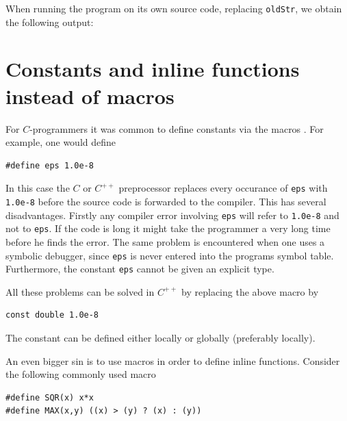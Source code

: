 When running the program on its own source code, replacing \verb+oldStr+, we
obtain the following output:



\section{Constants and inline functions instead of macros}

For $C$-programmers it was common to define constants  via the
macros  . For example, one would define
{\small \begin{verbatim}
#define eps 1.0e-8
\end{verbatim}}

\noindent
In this case the $C$ or $C^{++}$ preprocessor  replaces every
occurance of \verb+eps+ with \verb+1.0e-8+ before the source code is forwarded to
the compiler. This has several disadvantages. Firstly any compiler error involving
\verb+eps+ will refer to \verb+1.0e-8+ and not to \verb+eps+.
If the code is long it might take the programmer a very long time
before he finds the error. The same problem is encountered when one uses a symbolic
debugger, since \verb+eps+ is never entered into the programs symbol table.
Furthermore, the constant \verb+eps+ cannot be given an explicit type.

All these problems can be solved in $C^{++}$ by replacing the above macro by
{\small \begin{verbatim}
const double 1.0e-8
\end{verbatim}}
\noindent
The constant can be defined either locally or globally (preferably locally).

An even bigger sin is to use macros  in order to define inline functions.
  Consider the following commonly used macro
{\small \begin{verbatim}
#define SQR(x) x*x
#define MAX(x,y) ((x) > (y) ? (x) : (y))
\end{verbatim}}

